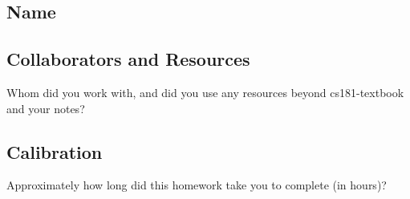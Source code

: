 \documentclass[submit]{harvardml}
\begin{document}
\newpage
\subsection*{Name}

\subsection*{Collaborators and Resources}
Whom did you work with, and did you use any resources beyond cs181-textbook and your notes?

\subsection*{Calibration}
Approximately how long did this homework take you to complete (in hours)? 
\end{document}
